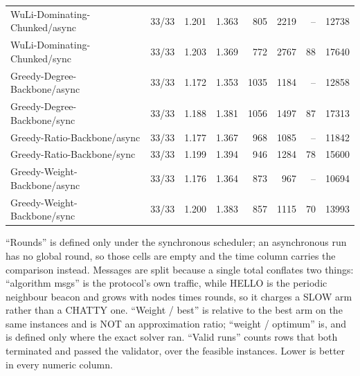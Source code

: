 \begin{table}[tb]
\begin{tabular}{lrrrrrrr}
WuLi-Dominating-Chunked/async & 33/33 & 1.201 & 1.363 & 805 & 2219 & -- & 12738 \\
WuLi-Dominating-Chunked/sync & 33/33 & 1.203 & 1.369 & 772 & 2767 & 88 & 17640 \\
Greedy-Degree-Backbone/async & 33/33 & 1.172 & 1.353 & 1035 & 1184 & -- & 12858 \\
Greedy-Degree-Backbone/sync & 33/33 & 1.188 & 1.381 & 1056 & 1497 & 87 & 17313 \\
Greedy-Ratio-Backbone/async & 33/33 & 1.177 & 1.367 & 968 & 1085 & -- & 11842 \\
Greedy-Ratio-Backbone/sync & 33/33 & 1.199 & 1.394 & 946 & 1284 & 78 & 15600 \\
Greedy-Weight-Backbone/async & 33/33 & 1.176 & 1.364 & 873 & 967 & -- & 10694 \\
Greedy-Weight-Backbone/sync & 33/33 & 1.200 & 1.383 & 857 & 1115 & 70 & 13993 \\
\bottomrule
\end{tabular}
\begin{flushleft}\footnotesize
``Rounds'' is defined only under the synchronous scheduler; an asynchronous run has no global round, so those cells are empty and the time column carries the comparison instead. Messages are split because a single total conflates two things: ``algorithm msgs'' is the protocol's own traffic, while HELLO is the periodic neighbour beacon and grows with nodes times rounds, so it charges a SLOW arm rather than a CHATTY one. ``Weight / best'' is relative to the best arm on the same instances and is NOT an approximation ratio; ``weight / optimum'' is, and is defined only where the exact solver ran. ``Valid runs'' counts rows that both terminated and passed the validator, over the feasible instances. Lower is better in every numeric column.
\end{flushleft}
\end{table}
